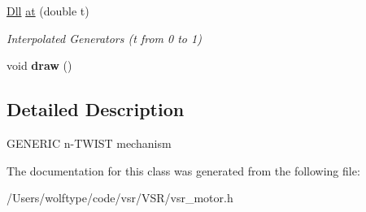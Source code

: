 \begin{DoxyCompactItemize}
\item 
\hypertarget{classvsr_1_1_n_twist_a0e17b50e624ffa15bd44c83c9629095c}{\hyperlink{namespacevsr_a6c6892b7aec25cfb16492501e2e35b11}{Dll} \hyperlink{classvsr_1_1_n_twist_a0e17b50e624ffa15bd44c83c9629095c}{at} (double t)}\label{classvsr_1_1_n_twist_a0e17b50e624ffa15bd44c83c9629095c}

\begin{DoxyCompactList}\small\item\em Interpolated Generators (t from 0 to 1) \end{DoxyCompactList}\item 
\hypertarget{classvsr_1_1_n_twist_ab6ea70dbc04b2949dc381bfedd8174e8}{void {\bfseries draw} ()}\label{classvsr_1_1_n_twist_ab6ea70dbc04b2949dc381bfedd8174e8}

\end{DoxyCompactItemize}


\subsection{Detailed Description}
G\-E\-N\-E\-R\-I\-C n-\/\-T\-W\-I\-S\-T mechanism 

The documentation for this class was generated from the following file\-:\begin{DoxyCompactItemize}
\item 
/\-Users/wolftype/code/vsr/\-V\-S\-R/vsr\-\_\-motor.\-h\end{DoxyCompactItemize}
